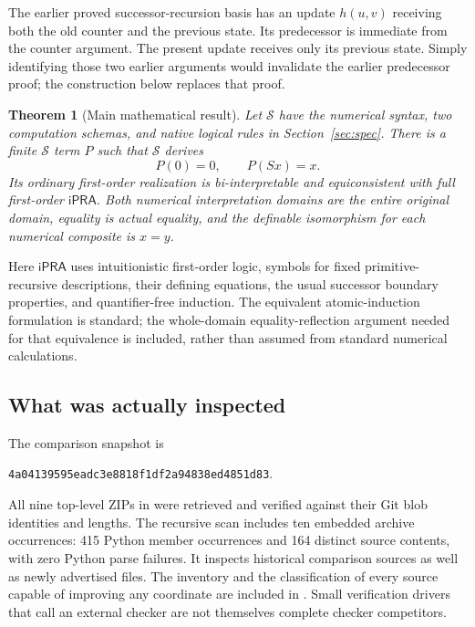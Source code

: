 \documentclass[11pt,letterpaper]{article}
\newtheorem{theorem}{Theorem}[section]
\theoremstyle{definition}\newtheorem{definition}[theorem]{Definition}
\theoremstyle{remark}\newtheorem{remark}[theorem]{Remark}
\newcommand{\ipra}{\mathsf{iPRA}}
\newcommand{\SR}{\mathcal S}
\newcommand{\file}[1]{\texttt{\detokenize{#1}}}
\begin{document}
The earlier proved successor-recursion basis\cite{counter} has an update
$h(u,v)$ receiving both the old counter and the previous state. Its
predecessor is immediate from the counter argument. The present update
receives only its previous state. Simply identifying those two earlier
arguments would invalidate the earlier predecessor proof; the construction
below replaces that proof.

\begin{theorem}[Main mathematical result]\label{thm:main}
Let $\SR$ have the numerical syntax, two computation schemas, and native
logical rules in Section~\ref{sec:spec}. There is a finite $\SR$ term $P$
such that $\SR$ derives
\[
                         P(0)=0,\qquad P(Sx)=x.
\]
Its ordinary first-order realization is bi-interpretable and equiconsistent
with full first-order $\ipra$. Both numerical interpretation domains are
the entire original domain, equality is actual equality, and the
definable isomorphism for each numerical composite is $x=y$.
\end{theorem}

Here $\ipra$ uses intuitionistic first-order logic, symbols for fixed
primitive-recursive descriptions, their defining equations, the usual
successor boundary properties, and quantifier-free induction. The
equivalent atomic-induction formulation is standard\cite{salehi}; the
whole-domain equality-reflection argument needed for that equivalence is
included, rather than assumed from standard numerical calculations.

\subsection{What was actually inspected}

The comparison snapshot is
\begin{center}\small
\texttt{4a04139595eadc3e8818f1df2a94838ed4851d83}.
\end{center}
All nine top-level ZIPs in \file{docs/drafts} were retrieved and verified
against their Git blob identities and lengths. The recursive scan includes
ten embedded archive occurrences: 415 Python member occurrences and 164
distinct source contents, with zero Python parse failures. It inspects
historical comparison sources as well as newly advertised files.
The inventory and the classification of every source capable of improving
any coordinate are included in \file{evidence/}. Small verification
drivers that call an external checker are not themselves complete
checker competitors.
\end{document}
